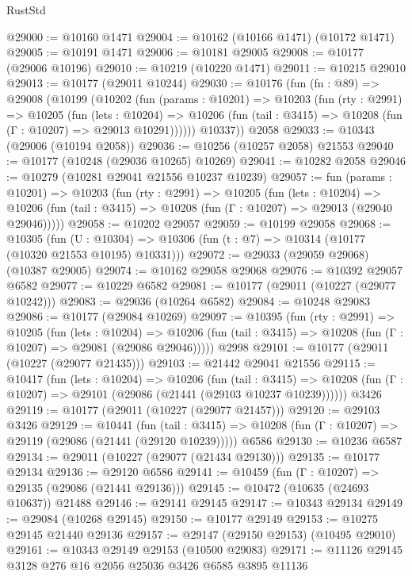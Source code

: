\begin{lexlean}{RustStd}
\begin{coremodule}
@29000 := @10160 @1471
@29004 := @10162 (@10166 @1471) (@10172 @1471)
@29005 := @10191 @1471
@29006 := @10181 @29005
@29008 := @10177 (@29006 @10196)
@29010 := @10219 (@10220 @1471)
@29011 := @10215 @29010
@29013 := @10177 (@29011 @10244)
@29030 := @10176
    (fun (fn : @89) =>
    @29008
      (@10199
        (@10202
          (fun (params : @10201) =>
          @10203
            (fun (rty : @2991) =>
            @10205
              (fun (lets : @10204) =>
              @10206 (fun (tail : @3415) => @10208 (fun (Γ : @10207) => @29013 @10291))))))
        @10337))
    @2058
@29033 := @10343 (@29006 (@10194 @2058))
@29036 := @10256 (@10257 @2058) @21553
@29040 := @10177 (@10248 (@29036 @10265) @10269)
@29041 := @10282 @2058
@29046 := @10279 (@10281 @29041 @21556 @10237 @10239)
@29057 := fun (params : @10201) =>
  @10203
    (fun (rty : @2991) =>
    @10205
      (fun (lets : @10204) =>
      @10206 (fun (tail : @3415) => @10208 (fun (Γ : @10207) => @29013 (@29040 @29046)))))
@29058 := @10202 @29057
@29059 := @10199 @29058
@29068 := @10305
    (fun (U : @10304) => @10306 (fun (t : @7) => @10314 (@10177 (@10320 @21553 @10195) @10331)))
@29072 := @29033 (@29059 @29068) (@10387 @29005)
@29074 := @10162 @29058 @29068
@29076 := @10392 @29057 @6582
@29077 := @10229 @6582
@29081 := @10177 (@29011 (@10227 (@29077 @10242)))
@29083 := @29036 (@10264 @6582)
@29084 := @10248 @29083
@29086 := @10177 (@29084 @10269)
@29097 := @10395
    (fun (rty : @2991) =>
    @10205
      (fun (lets : @10204) =>
      @10206 (fun (tail : @3415) => @10208 (fun (Γ : @10207) => @29081 (@29086 @29046)))))
    @2998
@29101 := @10177 (@29011 (@10227 (@29077 @21435)))
@29103 := @21442 @29041 @21556
@29115 := @10417
    (fun (lets : @10204) =>
    @10206
      (fun (tail : @3415) =>
      @10208 (fun (Γ : @10207) => @29101 (@29086 (@21441 (@29103 @10237 @10239))))))
    @3426
@29119 := @10177 (@29011 (@10227 (@29077 @21457)))
@29120 := @29103 @3426
@29129 := @10441
    (fun (tail : @3415) => @10208 (fun (Γ : @10207) => @29119 (@29086 (@21441 (@29120 @10239)))))
    @6586
@29130 := @10236 @6587
@29134 := @29011 (@10227 (@29077 (@21434 @29130)))
@29135 := @10177 @29134
@29136 := @29120 @6586
@29141 := @10459 (fun (Γ : @10207) => @29135 (@29086 (@21441 @29136)))
@29145 := @10472 (@10635 (@24693 @10637)) @21488
@29146 := @29141 @29145
@29147 := @10343 @29134
@29149 := @29084 (@10268 @29145)
@29150 := @10177 @29149
@29153 := @10275 @29145 @21440 @29136
@29157 := @29147 (@29150 @29153) (@10495 @29010)
@29161 := @10343 @29149 @29153 (@10500 @29083)
@29171 := @11126 @29145 @3128 @276 @16 @2056 @25036 @3426 @6585 @3895 @11136

\end{coremodule}
\end{lexlean}
